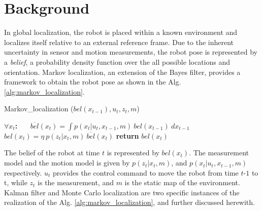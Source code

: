 \documentclass[10pt,journal,compsoc]{IEEEtran}
\begin{document}
%
%
%


\section{Background}

In global localization, the robot is placed within a known environment and localizes itself relative to an external reference frame. Due to the inherent uncertainty in sensor and motion measurements, the robot pose is represented by a \textit{belief}, a probability density function over the all possible locations and orientation.  Markov localization, an extension of the Bayes filter, provides a framework to obtain the robot pose as shown in the  Alg. \ref{alg:markov_localization}. 

\begin{algorithm}
\caption{Markov\_localization ($bel(x_{t-1}), u_t, z_t, m$)}\label{euclid}
\label{alg:markov_localization}
\begin{algorithmic}
\STATE  $\forall x_t$\textbf{:}
\STATE ~~~$\overline{bel}(x_t) = \int p(x_t | u_t, x_{t-1}, m)~bel(x_{t-1})~ dx_{t-1}$
\STATE ~~~$bel(x_t) = \eta~p(z_t | x_t, m)~\overline{bel}(x_t)$
\STATE \textbf{return} $bel(x_t)$
\end{algorithmic}
\end{algorithm}

The belief of the robot at time $t$ is represented by $bel(x_t)$. The measurement model and the motion model is given by $p(z_t | x_t, m)$, and $p(x_t | u_t, x_{t-1}, m)$ respectively. $u_t$ provides the control command to move the robot from time $t$-$1$ to t, while $z_t$ is the measurement, and $m$ is the static map of the environment. Kalman filter and Monte Carlo localization are two specific instances of the realization of the Alg. \ref{alg:markov_localization}, and further discussed herewith.   
\end{document}
